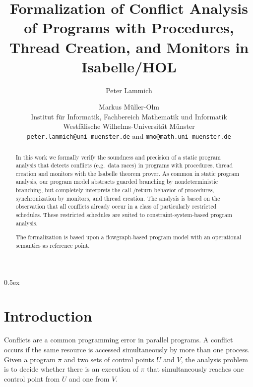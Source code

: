 \documentclass[11pt,a4paper]{article}
\begin{document}
\title{Formalization of Conflict Analysis of Programs with Procedures, Thread Creation, and Monitors in Isabelle/HOL}
\author{Peter Lammich
        \and
        Markus M\"uller-Olm \\[2ex]
%
        Institut f\"ur Informatik, Fachbereich Mathematik und Informatik\\
        Westf\"alische Wilhelms-Universit\"at M\"unster\\[1ex]
% 
        \texttt{peter.lammich@uni-muenster.de} and \texttt{mmo@math.uni-muenster.de}
       }

\maketitle

\begin{abstract}
  In this work we formally verify the soundness and precision of a static program analysis that detects conflicts (e.g.\ data races) in programs with procedures, thread creation and monitors with the Isabelle theorem prover. 
  As common in static program analysis, our program model abstracts guarded branching by nondeterministic branching, but completely interprets the call-/return behavior of procedures, synchronization by monitors, 
  and thread creation. The analysis is based on the observation that all conflicts already occur in a class of particularly restricted schedules. These restricted schedules are suited to constraint-system-based program analysis. 

  The formalization is based upon a flowgraph-based program model with an operational semantics as reference point. 
\end{abstract}

\clearpage
\tableofcontents
\clearpage

\parindent 0pt\parskip 0.5ex

\section{Introduction}
  Conflicts are a common programming error in parallel programs. A conflict occurs if the same resource is accessed simultaneously by more than one process.
  Given a program $\pi$ and two sets of control points $U$ and $V$, the analysis problem is to decide whether there is an execution of $\pi$ that simultaneously reaches one control
  point from $U$ and one from $V$.
\end{document}
